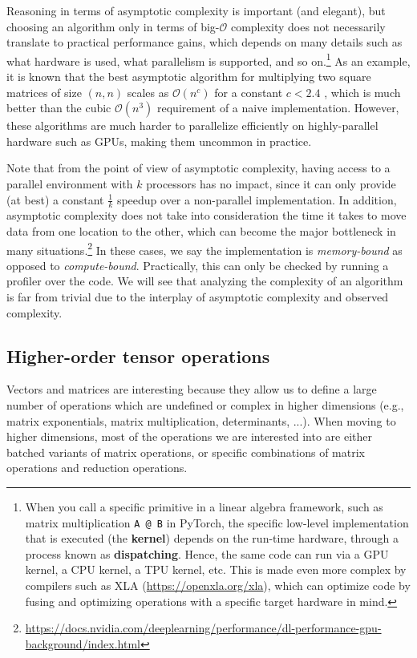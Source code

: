 Reasoning in terms of asymptotic complexity is important (and elegant), but choosing an algorithm only in terms of big-$\mathcal{O}$ complexity does not necessarily translate to practical performance gains, which depends on many details such as what hardware is used, what parallelism is supported, and so on.\footnote{When you call a specific primitive in a linear algebra framework, such as matrix multiplication \texttt{A @ B} in PyTorch, the specific low-level implementation that is executed (the \textbf{kernel}) depends on the run-time hardware, through a process known as \textbf{dispatching}. Hence, the same code can run via a GPU kernel, a CPU kernel, a TPU kernel, etc. This is made even more complex by compilers such as XLA (\url{https://openxla.org/xla}), which can optimize code by fusing and optimizing operations with a specific target hardware in mind.} As an example, it is known that the best asymptotic algorithm for multiplying two square matrices of size $(n,n)$ scales as $\mathcal{O}(n^c)$ for a constant $c < 2.4$ \cite{coppersmith1982asymptotic}, which is much better than the cubic $\mathcal{O}(n^3)$ requirement of a naive implementation. However, these algorithms are much harder to parallelize efficiently on highly-parallel hardware such as GPUs, making them uncommon in practice.

Note that from the point of view of asymptotic complexity, having access to a parallel environment with $k$ processors has no impact, since it can only provide (at best) a constant $\frac{1}{k}$ speedup over a non-parallel implementation. In addition, asymptotic complexity does not take into consideration the time it takes to move data from one location to the other, which can become the major bottleneck in many situations.\footnote{\url{https://docs.nvidia.com/deeplearning/performance/dl-performance-gpu-background/index.html}} In these cases, we say the implementation is \textit{memory-bound} as opposed to \textit{compute-bound}. Practically, this can only be checked by running a profiler over the code. We will see that analyzing the complexity of an algorithm is far from trivial due to the interplay of asymptotic complexity and observed complexity.

\subsection{Higher-order tensor operations}

Vectors and matrices are interesting because they allow us to define a large number of operations which are undefined or complex in higher dimensions (e.g., matrix exponentials, matrix multiplication, determinants, ...). When moving to higher dimensions, most of the operations we are interested into are either batched variants of matrix operations, or specific combinations of matrix operations and reduction operations. 

